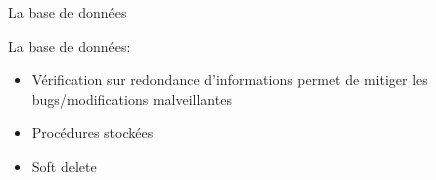\begin{frame}{La base de données}

 La base de données:
  \begin{itemize}
  \item Vérification sur redondance d'informations permet de mitiger les bugs/modifications malveillantes
  \item Procédures stockées
  \item Soft delete
  \end{itemize}
\end{frame}